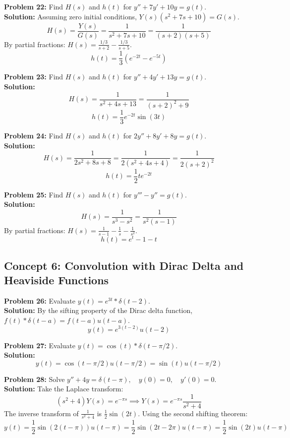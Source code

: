 \documentclass[11pt, letterpaper]{article}
\theoremstyle{definition}
\theoremstyle{remark}
\begin{document}
\textbf{Problem 22:} Find $H(s)$ and $h(t)$ for $y'' + 7y' + 10y = g(t)$.
\vspace{0.5em}\\
\textbf{Solution:}
Assuming zero initial conditions, $Y(s)(s^2+7s+10) = G(s)$.
\[ H(s) = \frac{Y(s)}{G(s)} = \frac{1}{s^2+7s+10} = \frac{1}{(s+2)(s+5)} \]
By partial fractions: $H(s) = \frac{1/3}{s+2} - \frac{1/3}{s+5}$.
\[ h(t) = \frac{1}{3}(e^{-2t} - e^{-5t}) \]

\textbf{Problem 23:} Find $H(s)$ and $h(t)$ for $y'' + 4y' + 13y = g(t)$.
\vspace{0.5em}\\
\textbf{Solution:}
\[ H(s) = \frac{1}{s^2+4s+13} = \frac{1}{(s+2)^2+9} \]
\[ h(t) = \frac{1}{3}e^{-2t}\sin(3t) \]

\textbf{Problem 24:} Find $H(s)$ and $h(t)$ for $2y'' + 8y' + 8y = g(t)$.
\vspace{0.5em}\\
\textbf{Solution:}
\[ H(s) = \frac{1}{2s^2+8s+8} = \frac{1}{2(s^2+4s+4)} = \frac{1}{2(s+2)^2} \]
\[ h(t) = \frac{1}{2}te^{-2t} \]

\textbf{Problem 25:} Find $H(s)$ and $h(t)$ for $y''' - y'' = g(t)$.
\vspace{0.5em}\\
\textbf{Solution:}
\[ H(s) = \frac{1}{s^3-s^2} = \frac{1}{s^2(s-1)} \]
By partial fractions: $H(s) = \frac{1}{s-1} - \frac{1}{s} - \frac{1}{s^2}$.
\[ h(t) = e^t - 1 - t \]

\subsection{Concept 6: Convolution with Dirac Delta and Heaviside Functions}

\textbf{Problem 26:} Evaluate $y(t) = e^{3t} * \delta(t-2)$.
\vspace{0.5em}\\
\textbf{Solution:}
By the sifting property of the Dirac delta function, $f(t) * \delta(t-a) = f(t-a)u(t-a)$.
\[ y(t) = e^{3(t-2)}u(t-2) \]

\textbf{Problem 27:} Evaluate $y(t) = \cos(t) * \delta(t-\pi/2)$.
\vspace{0.5em}\\
\textbf{Solution:}
\[ y(t) = \cos(t-\pi/2)u(t-\pi/2) = \sin(t)u(t-\pi/2) \]

\textbf{Problem 28:} Solve $y'' + 4y = \delta(t-\pi), \quad y(0) = 0, \quad y'(0) = 0$.
\vspace{0.5em}\\
\textbf{Solution:}
Take the Laplace transform:
\[ (s^2+4)Y(s) = e^{-\pi s} \implies Y(s) = e^{-\pi s} \frac{1}{s^2+4} \]
The inverse transform of $\frac{1}{s^2+4}$ is $\frac{1}{2}\sin(2t)$. Using the second shifting theorem:
\[ y(t) = \frac{1}{2}\sin(2(t-\pi))u(t-\pi) = \frac{1}{2}\sin(2t-2\pi)u(t-\pi) = \frac{1}{2}\sin(2t)u(t-\pi) \]
\end{document}
